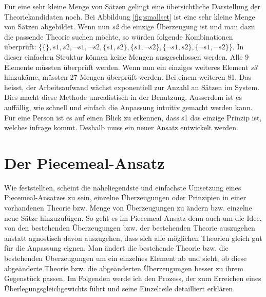 \documentclass{article}
\begin{document}
Für eine sehr kleine Menge von Sätzen gelingt eine übersichtliche Darstellung der Theoriekandidaten noch. Bei Abbildung \ref{fig:smallset} ist eine sehr kleine Menge von Sätzen abgebildet. Wenn nun \textit{s2} die einzige Überzeugung ist und man dazu die passende Theorie suchen möchte, so würden folgende Kombinationen überprüft: $\{\{\}, s1, s2, \neg s1, \neg s2, \{s1,s2\}, \{s1,\neg s2\}, \{\neg s1, s2 \}, \{\neg s1, \neg s2 \} \}$. In dieser einfachen Struktur können keine Mengen ausgeschlossen werden. Alle 9 Elemente müssten überprüft werden. Wenn nun ein einziges weiteres Element \textit{s3} hinzukäme, müssten 27 Mengen überprüft werden. Bei einem weiteren 81. Das heisst, der Arbeitsaufwand wächst exponentiell zur Anzahl an Sätzen im System. Dies macht diese Methode unrealistisch in der Benutzung. Ausserdem ist es auffällig, wie schnell und einfach die Anpassung intuitiv gemacht werden kann. Für eine Person ist es auf einen Blick zu erkennen, dass s1 das einzige Prinzip ist, welches infrage kommt. Deshalb muss ein neuer Ansatz entwickelt werden.


\section{Der Piecemeal-Ansatz} \label{piecemealansatz}
Wie \autocite[S.461]{beisbart_making_2021} feststellten, scheint die naheliegendste und einfachste Umsetzung eines Piecemeal-Ansatzes zu sein, einzelne Überzeugungen oder Prinzipien in einer vorhandenen Theorie bzw. Menge von Überzeugungen zu ändern bzw. einzelne neue Sätze hinzuzufügen. So geht es im Piecemeal-Ansatz denn auch um die Idee, von den bestehenden Überzeugungen bzw. der bestehenden Theorie auszugehen anstatt agnostisch davon auszugehen, dass sich alle möglichen Theorien gleich gut für die Anpassung eignen. Man ändert die bestehende Theorie bzw. die bestehenden Überzeugungen um ein einzelnes Element ab und sieht, ob diese abgeänderte Theorie bzw. die abgeänderten Überzeugungen besser zu ihrem Gegenstück passen. Im Folgenden werde ich den Prozess, der zum Erreichen eines Überlegungsgleichgewichts führt und seine Einzelteile detailliert erklären.
\end{document}
